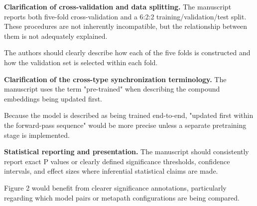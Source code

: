 \documentclass[11pt,american]{article}
\begin{document}
\begin{revresponse}

\end{revresponse}

\begin{revcomment}
\textbf{Clarification of cross-validation and data splitting.} The manuscript reports both five-fold cross-validation and a 6:2:2 training/validation/test split. These procedures are not inherently incompatible, but the relationship between them is not adequately explained.

The authors should clearly describe how each of the five folds is constructed and how the validation set is selected within each fold.
\end{revcomment}

\begin{revresponse}

\end{revresponse}

\begin{revcomment}
\textbf{Clarification of the cross-type synchronization terminology.} The manuscript uses the term "pre-trained" when describing the compound embeddings being updated first.

Because the model is described as being trained end-to-end, "updated first within the forward-pass sequence" would be more precise unless a separate pretraining stage is implemented.
\end{revcomment}

\begin{revresponse}

\end{revresponse}

\begin{revcomment}
\textbf{Statistical reporting and presentation.} The manuscript should consistently report exact P values or clearly defined significance thresholds, confidence intervals, and effect sizes where inferential statistical claims are made.

Figure 2 would benefit from clearer significance annotations, particularly regarding which model pairs or metapath configurations are being compared.
\end{revcomment}

\begin{revresponse}

\end{revresponse}
\end{document}
